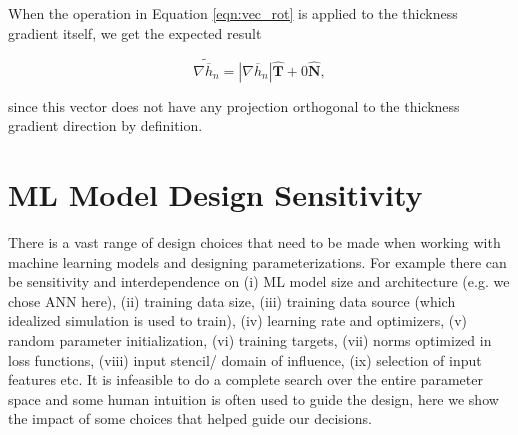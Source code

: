 \documentclass[draft,ms]{agutexSI2019}
\begin{document}
\begin{article}
When the operation in Equation \ref{eqn:vec_rot} is applied to the thickness gradient itself, we get the expected result 

\begin{equation}
    \widetilde{\nabla \overline{h}_n} = |\nabla \overline{h}_n| \hat{\mathbf{T}} + 0 \hat{\mathbf{N}},
\end{equation}
 
since this vector does not have any projection orthogonal to the thickness gradient direction by definition.




\section{ML Model Design Sensitivity}
\label{app:ML_model_sensitivity}
There is a vast range of design choices that need to be made when working with machine learning models and designing parameterizations. For example there can be sensitivity and interdependence on (i) ML model size and architecture (e.g. we chose ANN here), (ii) training data size, (iii) training data source (which idealized simulation is used to train), (iv) learning rate and optimizers, (v) random parameter initialization, (vi) training targets, (vii) norms optimized in loss functions, (viii) input stencil/ domain of influence, (ix) selection of input features etc. It is infeasible to do a complete search over the entire parameter space and some human intuition is often used to guide the design, here we show the impact of some choices that helped guide our decisions. 


\end{article}
\end{document}
